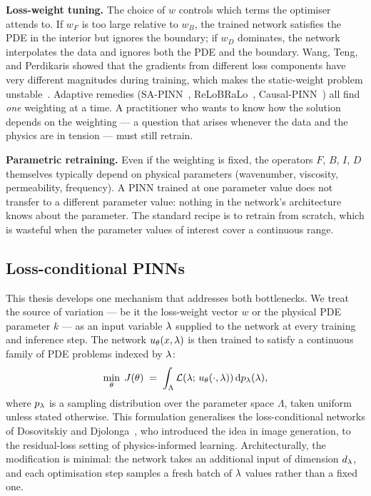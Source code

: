 \documentclass[12pt,a4paper]{extarticle}
\begin{document}
\textbf{Loss-weight tuning.} The choice of $w$ controls which terms the optimiser attends to. If $w_F$ is too large relative to $w_B$, the trained network satisfies the PDE in the interior but ignores the boundary; if $w_D$ dominates, the network interpolates the data and ignores both the PDE and the boundary. Wang, Teng, and Perdikaris showed that the gradients from different loss components have very different magnitudes during training, which makes the static-weight problem unstable~\cite{wang2021understanding}. Adaptive remedies (SA-PINN~\cite{mcclenny2020sapinn}, ReLoBRaLo~\cite{bischof2021relobralo}, Causal-PINN~\cite{wang2024causal}) all find \emph{one} weighting at a time. A practitioner who wants to know how the solution depends on the weighting --- a question that arises whenever the data and the physics are in tension --- must still retrain.

\textbf{Parametric retraining.} Even if the weighting is fixed, the operators $F$, $B$, $I$, $D$ themselves typically depend on physical parameters (wavenumber, viscosity, permeability, frequency). A PINN trained at one parameter value does not transfer to a different parameter value: nothing in the network's architecture knows about the parameter. The standard recipe is to retrain from scratch, which is wasteful when the parameter values of interest cover a continuous range.

\subsection{Loss-conditional PINNs}

This thesis develops one mechanism that addresses both bottlenecks. We treat the source of variation --- be it the loss-weight vector $w$ or the physical PDE parameter $k$ --- as an input variable $\lambda$ supplied to the network at every training and inference step. The network $u_\theta(x, \lambda)$ is then trained to satisfy a continuous family of PDE problems indexed by $\lambda$:
\begin{equation}
    \min_\theta \; J(\theta) \;=\; \int_{\Lambda} \mathcal{L}(\lambda;\, u_\theta(\cdot,\lambda))\, \mathrm{d} p_\lambda(\lambda),
    \label{eq:lc-objective}
\end{equation}
where $p_\lambda$ is a sampling distribution over the parameter space $\Lambda$, taken uniform unless stated otherwise. This formulation generalises the loss-conditional networks of Dosovitskiy and Djolonga~\cite{dosovitskiy2020}, who introduced the idea in image generation, to the residual-loss setting of physics-informed learning. Architecturally, the modification is minimal: the network takes an additional input of dimension $d_\lambda$, and each optimisation step samples a fresh batch of $\lambda$ values rather than a fixed one.
\end{document}

